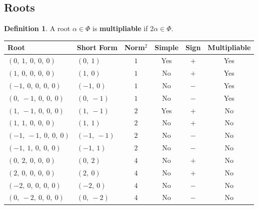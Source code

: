\documentclass[11pt]{article}
\newcommand{\noi}{\noindent}
\newcommand{\tbf}{\textbf}
\theoremstyle{definition}
\newtheorem{definition}{Definition}[section]
\begin{document}
\subsection{Roots}

\begin{definition}
A root $\alpha \in \Phi$ is \tbf{multipliable} if $2\alpha \in \Phi$.
\end{definition}

\noi \begin{tabular}{|l|l|c|c|c|c|}
    \hline
    \textbf{Root} & \textbf{Short Form} & \textbf{Norm$^2$} & \textbf{Simple} & \textbf{Sign} & \textbf{Multipliable} \\
    \hline
    $\left( 0, \  1, \  0, \  0, \  0\right)$ & $\left( 0, \  1\right)$ & $1$ & Yes & $+$ & Yes \\
    \hline
    $\left( 1, \  0, \  0, \  0, \  0\right)$ & $\left( 1, \  0\right)$ & $1$ & No & $+$ & Yes \\
    \hline
    $\left( -1, \  0, \  0, \  0, \  0\right)$ & $\left( -1, \  0\right)$ & $1$ & No & $-$ & Yes \\
    \hline
    $\left( 0, \  -1, \  0, \  0, \  0\right)$ & $\left( 0, \  -1\right)$ & $1$ & No & $-$ & Yes \\
    \hline
    $\left( 1, \  -1, \  0, \  0, \  0\right)$ & $\left( 1, \  -1\right)$ & $2$ & Yes & $+$ & No \\
    \hline
    $\left( 1, \  1, \  0, \  0, \  0\right)$ & $\left( 1, \  1\right)$ & $2$ & No & $+$ & No \\
    \hline
    $\left( -1, \  -1, \  0, \  0, \  0\right)$ & $\left( -1, \  -1\right)$ & $2$ & No & $-$ & No \\
    \hline
    $\left( -1, \  1, \  0, \  0, \  0\right)$ & $\left( -1, \  1\right)$ & $2$ & No & $-$ & No \\
    \hline
    $\left( 0, \  2, \  0, \  0, \  0\right)$ & $\left( 0, \  2\right)$ & $4$ & No & $+$ & No \\
    \hline
    $\left( 2, \  0, \  0, \  0, \  0\right)$ & $\left( 2, \  0\right)$ & $4$ & No & $+$ & No \\
    \hline
    $\left( -2, \  0, \  0, \  0, \  0\right)$ & $\left( -2, \  0\right)$ & $4$ & No & $-$ & No \\
    \hline
    $\left( 0, \  -2, \  0, \  0, \  0\right)$ & $\left( 0, \  -2\right)$ & $4$ & No & $-$ & No \\
    \hline
\end{tabular}
\end{document}
